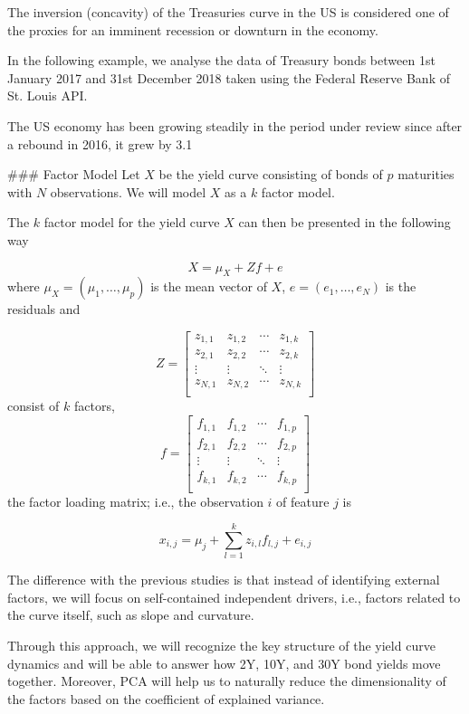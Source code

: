 \begin{enumerate}
The inversion (concavity) of the Treasuries curve in the US is considered one of the proxies for an imminent recession or downturn in the economy.

In the following example, we analyse the data of Treasury bonds between 1st January 2017 and 31st December 2018 taken using the Federal Reserve Bank of St. Louis API.

The US economy has been growing steadily in the period under review since after a rebound in 2016, it grew by 3.1%

### Factor Model
Let $X$ be the yield curve consisting of bonds of $p$ maturities with $N$ observations. We will model $X$ as a $k$ factor model.

The $k$ factor model for the yield curve $X$ can then be presented in the following way

$$
X = \mu_ X + Zf + e
$$
where $\mu_X = (\mu_1,\ldots, \mu_p)$ is the mean vector of $X$, $e = (e_1,\ldots, e_N )$ is the residuals and

$$
Z =
\begin{bmatrix}
z_{1,1} & z_{1,2} & \cdots & z_{1,k} \\
z_{2,1} & z_{2,2} & \cdots & z_{2,k} \\
\vdots & \vdots & \ddots & \vdots \\
z_{N,1} & z_{N,2} & \cdots & z_{N,k} \\
\end{bmatrix}
$$
consist of $k$ factors,
$$
f =
\begin{bmatrix}
f_{1,1} & f_{1,2} & \cdots & f_{1,p} \\
f_{2,1} & f_{2,2} & \cdots & f_{2,p} \\
\vdots & \vdots & \ddots & \vdots \\
f_{k,1} & f_{k,2} & \cdots & f_{k,p} \\
\end{bmatrix}
$$
the factor loading matrix; i.e., the observation $i$ of feature $j$ is

$$
x_{i,j} = \mu_j + \sum_{l=1}^k z_{i,l}f_{l,j} + e_{i,j}
$$

The difference with the previous studies is that instead of identifying external factors, we will focus on self-contained independent drivers, i.e., factors related to the curve itself, such as slope and curvature.

Through this approach, we will recognize the key structure of the yield curve dynamics and will be able to answer how 2Y, 10Y, and 30Y bond yields move together. Moreover, PCA will help us to naturally reduce the dimensionality of the factors based on the coefficient of explained variance.



\end{enumerate}
